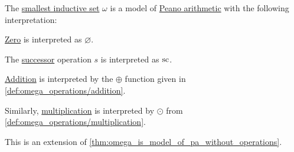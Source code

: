 \begin{theorem}\label{thm:omega_is_model_of_pa}
  The \hyperref[thm:smallest_inductive_set_existence]{smallest inductive set} \( \omega \) is a model of \hyperref[def:peano_arithmetic]{Peano arithmetic} with the following interpretation:
  \begin{thmenum}
     \hyperref[def:peano_arithmetic/zero]{Zero} is interpreted as \( \varnothing \).

     The \hyperref[def:peano_arithmetic/succ]{successor} operation \( s \) is interpreted as \( \op{sc} \).

     \hyperref[def:peano_arithmetic/plus]{Addition} is interpreted by the \( \oplus \) function given in \cref{def:omega_operations/addition}.

     Similarly, \hyperref[def:peano_arithmetic/mult]{multiplication} is interpreted by \( \odot \) from \cref{def:omega_operations/multiplication}.
  \end{thmenum}
\end{theorem}
\begin{comments}
  \item This is an extension of \cref{thm:omega_is_model_of_pa_without_operations}.
\end{comments}
